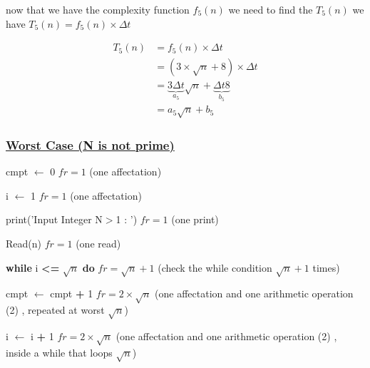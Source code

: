 \vspace{0.5cm}
now that we have the complexity function \(f_5(n)\) we need to find the \(T_5(n)\)  we have \(T_5(n) = f_5(n) \times \Delta t\)

\begin{align*}
T_5(n) &= f_5(n) \times \Delta t\\ 
&= (3\times\sqrt{n} + 8) \times \Delta t \\
&= \underbrace{3\Delta t}_{a_5} \sqrt{n} + \underbrace{\Delta t 8}_{b_5} \\
&= \boxed{a_5\sqrt{n}+b_5} 
\end{align*}

\subsubsection*{\underline{Worst Case (N is not prime)}}

\vspace{0.5cm}
cmpt $\gets$ 0  \hspace{4cm} \(fr = 1\) (one affectation)

\vspace{0.15cm}
i $\gets$ 1  \hspace{4.65cm} \(fr = 1\) (one affectation)

\vspace{0.15cm}
\textcolor{purplePlot!80!black}{print}(\textcolor{blueArea!60!black}{'Input Integer N\(>\)1 : '})  \hspace{0.95cm} \(fr = 1\) (one print)

\vspace{0.15cm}
\textcolor{purplePlot!80!black}{Read}(n)  \hspace{4.25cm} \(fr = 1\) (one read)

\vspace{0.15cm}

\textbf{while} i \textcolor{redPlot}{\textbf{\textless=}} \(\sqrt{n}\)  \textbf{do} \hspace{2.45cm} \(fr = \sqrt{n}+1\) (check the while condition \(\sqrt{n}+1\) times)


\vspace{0.15cm}
cmpt $\gets$ cmpt \textcolor{redPlot}{ \textbf{+}} 1 \hspace{2.6cm} \(fr = 2\times\sqrt{n}\) (one affectation and one arithmetic operation (2) , repeated at worst \(\sqrt{n}\))

\vspace{0.15cm}
i $\gets$ i \textcolor{redPlot}{ \textbf{+}} 1 \hspace{3.95cm} \(fr = 2\times\sqrt{n}\) (one affectation and one arithmetic operation (2) , inside a while that loops \(\sqrt{n}\))


